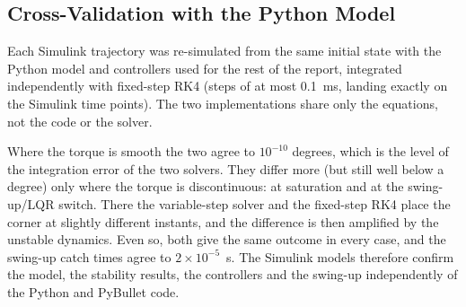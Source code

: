 \documentclass[12pt,a4paper]{article}
\begin{document}
\subsection{Cross-Validation with the Python Model}
Each Simulink trajectory was re-simulated from the same initial state with the Python model and controllers used for the rest of the report, integrated independently with fixed-step RK4 (steps of at most 0.1~ms, landing exactly on the Simulink time points). The two implementations share only the equations, not the code or the solver.
\begin{table}[H]
\centering
\caption{Simulink vs.\ Python (maximum angle difference over the whole run)}
\label{tab:slxpy}
\end{table}
Where the torque is smooth the two agree to $10^{-10}$ degrees, which is the level of the integration error of the two solvers. They differ more (but still well below a degree) only where the torque is discontinuous: at saturation and at the swing-up/LQR switch. There the variable-step solver and the fixed-step RK4 place the corner at slightly different instants, and the difference is then amplified by the unstable dynamics. Even so, both give the same outcome in every case, and the swing-up catch times agree to $2\times10^{-5}$~s. The Simulink models therefore confirm the model, the stability results, the controllers and the swing-up independently of the Python and PyBullet code.
\end{document}
